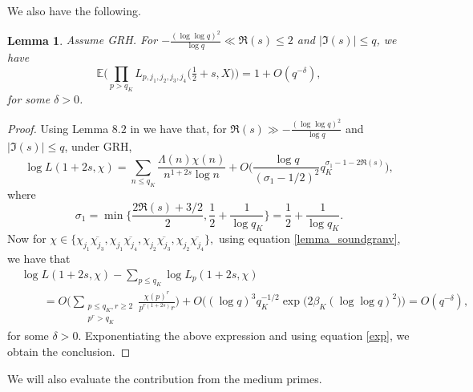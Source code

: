 \documentclass[12pt, reqno]{amsart}
\newcommand{\E}{\mathbb{E}}
\newtheorem{lemma}[theorem]{Lemma}
\numberwithin{equation}{section}
\numberwithin{theorem}{section}
\numberwithin{equation}{section}
\begin{document}
We also have the following.
\begin{lemma}\label{bigprimes}
   Assume GRH. For $-\frac{(\log \log q)^2}{\log q} \ll  \Re(s) \leq 2$ and $|\Im(s)|\leq q$, we have 
    $$ \E \Bigg(  \prod_{p>q_K} L_{p,j_1,j_2,j_3,j_4}\big( \tfrac{1}{2}+s,X \big)\Bigg)  = 1+ O ( q^{-\delta}),  $$
    for some $\delta>0$.
\end{lemma}
\begin{proof}
    Using Lemma $8.2$ in \cite{gs} we have that, for $\Re(s)\gg -\frac{(\log \log q)^2}{\log q}$ and $|\Im(s)| \leq q$, under GRH, 
    \begin{equation} \label{lemma_soundgranv}
         \log L(1+2s,\chi) = \sum_{n\leq q_K} \frac{\Lambda(n) \chi(n)}{n^{1+2s} \log n} + O \Big(  \frac{ \log q}{(\sigma_1 - 1/2)^2} q_K^{\sigma_1 - 1-2\Re(s)}\Big),
         \end{equation} where
    $$\sigma_1 = \min \Big\{ \frac{ 2\Re(s)+3/2}{2}, \frac{1}{2} + \frac{1}{ \log q_K} \Big\}= \frac{1}{2}+\frac{1}{ \log q_K}.$$
    Now for $\chi \in \{ \chi_{j_1} \overline{\chi_{j_3}}, \chi_{j_1} \overline{\chi_{j_4}}, \chi_{j_2} \overline{\chi_{j_3}},\chi_{j_2} \overline{\chi_{j_4}}\}, $ using equation \eqref{lemma_soundgranv}, we have that 
\begin{align*}
   & \log L(1+2s,\chi)  - \sum_{p \leq q_K} \log L_p(1+2s,\chi)\\
   &\qquad= O \bigg( \sum_{\substack{ p \leq q_K, r \geq 2 \\ p^r>q_K}} \frac{\chi(p)^r}{p^{r(1+2s)}r}\bigg)+O \Big( (\log q)^3 q_K^{-1/2} \exp \Big( 2 \beta_K (\log \log q)^2\Big)\Big) = O ( q^{-\delta}),
\end{align*}
    for some $\delta>0$. Exponentiating the above expression and using equation \eqref{exp}, we obtain the conclusion.
\end{proof}

We will also evaluate the contribution from the medium primes.
\end{document}
